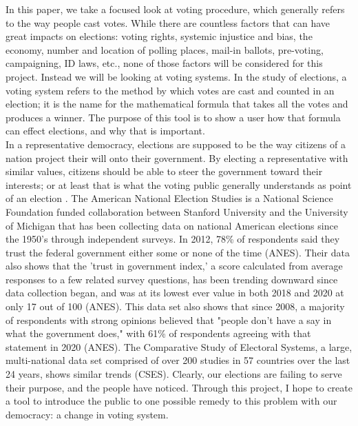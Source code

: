 \documentclass[12pt]{article}
\begin{document}
\qquad In this paper, we take a focused look at voting procedure, which generally refers to the way people cast votes. While there are countless factors that can have great impacts on elections: voting rights, systemic injustice and bias, the economy, number and location of polling places, mail-in ballots, pre-voting, campaigning, ID laws, etc., none of those factors will be considered for this project. Instead we will be looking at voting systems. In the study of elections, a voting system refers to the method by which votes are cast and counted in an election; it is the name for the mathematical formula that takes all the votes and produces a winner. The purpose of this tool is to show a user how that formula can effect elections, and why that is important. \\

\qquad In a representative democracy, elections are supposed to be the way citizens of a nation project their will onto their government. By electing a representative with similar values, citizens should be able to steer the government toward their interests; or at least that is what the voting public generally understands as point of an election \parencite{przeworski}. The American National Election Studies is a National Science Foundation funded collaboration between Stanford University and the University of Michigan that has been collecting data on national American elections since the 1950's through independent surveys. In 2012, 78\% of respondents said they trust the federal government either some or none of the time (ANES). Their data also shows that the 'trust in government index,' a score calculated from average responses to a few related survey questions, has been trending downward since data collection began, and was at its lowest ever value in both 2018 and 2020 at only 17 out of 100 (ANES). This data set also shows that since 2008, a majority of respondents with strong opinions believed that "people don't have a say in what the government does," with 61\% of respondents agreeing with that statement in 2020 (ANES). The Comparative Study of Electoral Systems, a large, multi-national data set comprised of over 200 studies in 57 countries over the last 24 years, shows similar trends (CSES). Clearly, our elections are failing to serve their purpose, and the people have noticed. Through this project, I hope to create a tool to introduce the public to one possible remedy to this problem with our democracy: a change in voting system. \\
\end{document}
